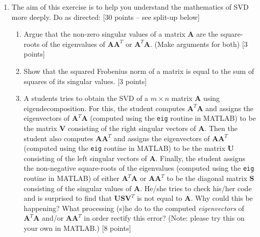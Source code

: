 \documentclass[11pt]{article}
\begin{document}
\begin{enumerate}
\item The aim of this exercise is to help you understand the mathematics of SVD more deeply. Do as directed: \textsf{[30 points -- see split-up below]}
\begin{enumerate}
\item Argue that the non-zero singular values of a matrix $\boldsymbol{A}$ are the square-roots of the eigenvalues of $\boldsymbol{AA}^T$ or $\boldsymbol{A}^T\boldsymbol{A}$. (Make arguments for both) \textsf{[3 points]}
\item Show that the squared Frobenius norm of a matrix is equal to the sum of squares of its singular values. \textsf{[3 points]}
\item A students tries to obtain the SVD of a $m \times n$ matrix $\boldsymbol{A}$ using eigendecomposition. For this, the student computes $\boldsymbol{A}^T \boldsymbol{A}$ and assigns the eigenvectors of $\boldsymbol{A}^T \boldsymbol{A}$ (computed using the \texttt{eig} routine in MATLAB) to be the matrix $\boldsymbol{V}$ consisting of the right singular vectors of $\boldsymbol{A}$. Then the student also computes $\boldsymbol{A} \boldsymbol{A}^T$ and assigns the eigenvectors of $\boldsymbol{A}\boldsymbol{A}^T$ (computed using the \texttt{eig} routine in MATLAB) to be the matrix $\boldsymbol{U}$ consisting of the left singular vectors of $\boldsymbol{A}$. Finally, the student assigns the non-negative square-roots of the eigenvalues (computed using the \texttt{eig} routine in MATLAB) of either $\boldsymbol{A}^T \boldsymbol{A}$ or $\boldsymbol{A} \boldsymbol{A}^T$ to be the diagonal matrix $\boldsymbol{S}$ consisting of the singular values of $\boldsymbol{A}$. He/she tries to check his/her code and is surprised to find that $\boldsymbol{USV}^T$ is not equal to $\boldsymbol{A}$. Why could this be happening? What processing (s)he do to the computed \emph{eigenvectors} of $\boldsymbol{A}^T \boldsymbol{A}$ and/or $\boldsymbol{A}\boldsymbol{A}^T$ in order rectify this error? (Note: please try this on your own in MATLAB.) \textsf{[8 points]}


\end{enumerate}
\end{enumerate}
\end{document}
